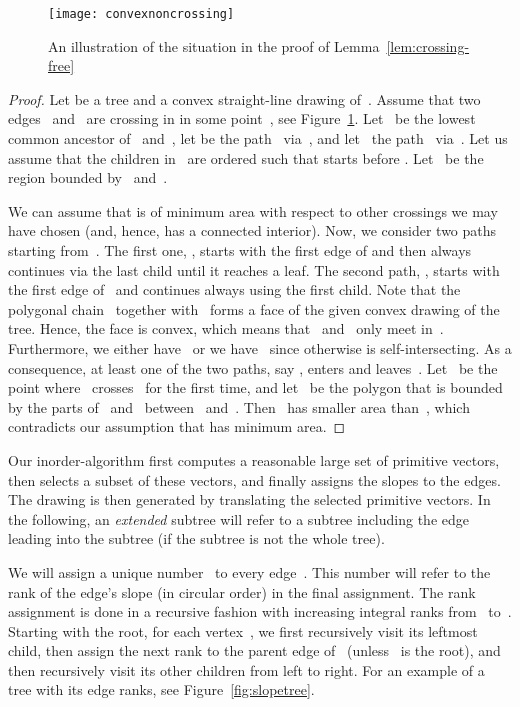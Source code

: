 \documentclass[a4paper,11pt]{article}
\theoremstyle{plain}
\begin{document}
  \begin{figure}[t]
    \centering
    \texttt{[image: convexnoncrossing]}
    \caption{An illustration of the situation in the proof of
      Lemma~\ref{lem:crossing-free}} 
    \label{fig:crossingfree}
  \end{figure}

\begin{proof}
  Let  be a tree and  a convex straight-line drawing
  of~.  Assume that two edges~ and~ are
  crossing in  in some point~, see
  Figure~\ref{fig:crossingfree}.  Let~ be the lowest common ancestor
  of~ and~, let  be the path~ via~,
  and let~ the path~ via~. Let us assume
  that the children in~ are ordered such that  starts before
  .  Let~ be the region bounded by~ and~.

  We can assume that  is of minimum area with respect to other
  crossings we may have chosen (and, hence,  has a connected
  interior).  Now, we consider two paths starting from~. The first
  one, , starts with the first edge of  and then
  always continues via the last child until it reaches a leaf. The
  second path, , starts with the first edge of~ and
  continues always using the first child.  Note that the polygonal
  chain~ together with~ forms a face  of the
  given convex drawing of the tree.  Hence, the face is convex, which
  means that~ and~ only meet in~.  Furthermore, we
  either have~ or we have~ since
  otherwise  is self-intersecting.  As a consequence, at least
  one of the two paths, say , enters and leaves~.
  Let~ be the point where~ crosses~ for the first
  time, and let~ be the polygon that is bounded by the parts
  of~ and~ between~ and~.  Then~ has
  smaller area than~, which contradicts our assumption that 
  has minimum area.
\end{proof}

Our inorder-algorithm first computes a reasonable large set of primitive 
vectors, then selects a subset of these vectors, and finally assigns the slopes 
to the edges. The drawing is then generated by translating the selected 
primitive vectors. In the following, an \emph{extended}
subtree will refer to a subtree including the edge leading into the subtree
(if the subtree is not the whole tree).  

We will assign a unique number~ to every edge~.  This number will
refer to the rank of the edge's slope (in circular order) in the final
assignment.  The rank assignment is done in a recursive fashion with increasing integral ranks from~ to~. Starting with the root, for each vertex~,
 we first recursively visit its leftmost child, then assign the next rank
 to the parent edge of~ (unless~ is the root), and then recursively visit
 its other children from left to right. For an example of a tree with its edge 
 ranks, see Figure~\ref{fig:slopetree}.
\end{document}
